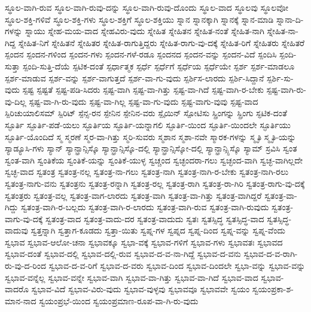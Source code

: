 {ಸ್ಥೂಲ-ವಾಗಿ-ರುವ
ಸ್ಥೂಲ-ವಾಗಿ-ರುವು-ದನ್ನು
ಸ್ಥೂಲ-ವಾಗಿ-ರುವು-ದೊಂದು
ಸ್ಥೂಲ-ವಾದ
ಸ್ಥೂಲವು
ಸ್ಥೂಲವೋ
ಸ್ಥೂಲ-ಶಕ್ತಿ-ಗಳಿವೆ
ಸ್ಥೂಲ-ಶಕ್ತಿ-ಗಳು
ಸ್ಥೂಲ-ಶಕ್ತಿಗೆ
ಸ್ಥೂಲ-ಶಕ್ತಿಯು
ಸ್ನಾನ
ಸ್ನಾನಕ್ಕಾಗಿ
ಸ್ನಾನಕ್ಕೆ
ಸ್ನಾನ-ಮಾಡಿ
ಸ್ನಾನಾ-ದಿ-ಗಳನ್ನು
ಸ್ನಾಯು
ಸ್ನೇಹ-ಮಯ-ವಾದ
ಸ್ನೇಹವಿರು-ವುದು
ಸ್ನೇಹಿತ
ಸ್ನೇಹಿತನ
ಸ್ನೇಹಿತ-ನಂತೆ
ಸ್ನೇಹಿತ-ನಾಗಿ
ಸ್ನೇಹಿತ-ನಾ-ಗಿದ್ದ
ಸ್ನೇಹಿತ-ನಿಗೆ
ಸ್ನೇಹಿತನೆ
ಸ್ನೇಹಿತರ
ಸ್ನೇಹಿತ-ರಾಗುತ್ತಿದ್ದರು
ಸ್ನೇಹಿತ-ರಾಗು-ವು-ದಕ್ಕೆ
ಸ್ನೇಹಿತ-ರಿಗೆ
ಸ್ನೇಹಿತರು
ಸ್ನೇಹಿತರೆ
ಸ್ಪಂದನ
ಸ್ಪಂದನ-ಗಳಿಂದ
ಸ್ಪಂದನ-ಗಳು
ಸ್ಪಂದನ-ಗಳೆ-ರಡೂ
ಸ್ಪಂದನದ
ಸ್ಪಂದನ-ವನ್ನು
ಸ್ಪಂದನ-ವಿದೆ
ಸ್ಪಂದಿಸಿ
ಸ್ಪಂದಿ-ಸುತ್ತಾ
ಸ್ಪಂದಿ-ಸುತ್ತಿ-ದೆಯೆ
ಸ್ಪಟಿಕ-ದಂತೆ
ಸ್ಪರ್ಧಾತ್ಮಕ
ಸ್ಪರ್ಧೆ
ಸ್ಪರ್ಧೆಗೆ
ಸ್ಪರ್ಧೆಯ
ಸ್ಪರ್ಧೆಯೇ
ಸ್ಪರ್ಶ
ಸ್ಪರ್ಶ-ಮಾಡಲೂ
ಸ್ಪರ್ಶ-ಮಾಡುವ
ಸ್ಪರ್ಶ-ವನ್ನು
ಸ್ಪರ್ಶ-ವಾಗುತ್ತದೆ
ಸ್ಪರ್ಶ-ವಾ-ಗು-ವುದು
ಸ್ಪರ್ಶಿಸ-ಲಾರದು
ಸ್ಪರ್ಶಿ-ಸಿದ್ದಾನೆ
ಸ್ಪರ್ಶಿ-ಸು-ವುದು
ಸ್ಪಷ್ಟ
ಸ್ಪಷ್ಟತೆ
ಸ್ಪಷ್ಟ-ಪಡಿ-ಸಿದರು
ಸ್ಪಷ್ಟ-ವಾಗಿ
ಸ್ಪಷ್ಟ-ವಾ-ಗಿತ್ತು
ಸ್ಪಷ್ಟ-ವಾ-ಗಿದೆ
ಸ್ಪಷ್ಟ-ವಾಗಿ-ರ-ಬೇಕು
ಸ್ಪಷ್ಟ-ವಾಗಿ-ರು-ವು-ದಿಲ್ಲ
ಸ್ಪಷ್ಟ-ವಾ-ಗಿ-ರು-ವುದು
ಸ್ಪಷ್ಟ-ವಾ-ಗಿಲ್ಲ
ಸ್ಪಷ್ಟ-ವಾ-ಗು-ವುದು
ಸ್ಪಷ್ಟ-ವಾಗು-ವುವು
ಸ್ಪಷ್ಟ-ವಾದ
ಸ್ಪಿರಿಚುಯಾಲಿಸಮ್
ಸ್ಪಿರಿಟ್
ಸ್ಪೆನ್ಸ-ರನ
ಸ್ಪೇನಿನ
ಸ್ಪೇನಿನ-ವರು
ಸ್ಪೈಯಿನ್
ಸ್ಪೋಟಿಸು
ಸ್ಪ್ರಿಂಗನ್ನು
ಸ್ಪ್ರಿಂಗು
ಸ್ಫಟಿಕ-ದಂತೆ
ಸ್ಫೂರ್ತಿ
ಸ್ಫೂರ್ತಿ-ಪಡೆ-ಯಲು
ಸ್ಫೂರ್ತಿಯ
ಸ್ಫೂರ್ತಿ-ಯನ್ನಾಗಲಿ
ಸ್ಫೂರ್ತಿ-ಯಿಂದ
ಸ್ಫೂರ್ತಿ-ಯಿಂದಲೇ
ಸ್ಫೂರ್ತಿಯು
ಸ್ಫೂರ್ತಿ-ಯೊಂದಿದೆ
ಸ್ಮ
ಸ್ಮರಣೆ
ಸ್ಮರ-ವಾ-ಗಿತ್ತು
ಸ್ಮರಿ-ಸುವರು
ಸ್ಮಶಾನ
ಸ್ಮಶಾ-ನವೇ
ಸ್ಮಾರಕ-ಗಳನ್ನು
ಸ್ಮೃತಿ
ಸ್ಮೃತಿ-ಯನ್ನು
ಸ್ಯಾಡ್ಯೂಸಿ-ಗಳು
ಸ್ಯಾನ್
ಸ್ಯಾನ್ಫ್ರಾನ್ಸಿಸ್ಕೊ
ಸ್ಯಾನ್ಫ್ರಾನ್ಸಿಸ್ಕೊ-ದಲ್ಲಿ
ಸ್ಯಾನ್ಫ್ರಾನ್ಸಿಸ್ಕೋ-ದಲ್ಲಿ
ಸ್ಯಾನ್ಫ್ರಾನ್ಸ್ಸಿಸ್ಕೊ
ಸ್ಯಾಮ್
ಸ್ರವಿಸಿ
ಸ್ವಂತ
ಸ್ವಂತ-ವಾಗಿ
ಸ್ವಂತಿಕೆಯ
ಸ್ವಂತಿಕೆ-ಯನ್ನು
ಸ್ವಂತಿಕೆ-ಯುಳ್ಳ
ಸ್ವಚ್ಚಂದ
ಸ್ವಚ್ಛಂದರಾ-ಗಲು
ಸ್ವಚ್ಛಂದ-ವಾಗಿ
ಸ್ವಚ್ಛ-ವಾಗಿಲ್ಲದೇ
ಸ್ವಚ್ಛ-ವಾದ
ಸ್ವತಂತ್ರ
ಸ್ವತಂತ್ರ-ನಲ್ಲ
ಸ್ವತಂತ್ರ-ನಾ-ಗಲು
ಸ್ವತಂತ್ರ-ನಾಗಿ
ಸ್ವತಂತ್ರ-ನಾಗಿ-ರ-ಬೇಕು
ಸ್ವತಂತ್ರ-ನಾಗಿ-ರಲು
ಸ್ವತಂತ್ರ-ನಾಗು-ವನು
ಸ್ವತಂತ್ರನು
ಸ್ವತಂತ್ರ-ರನ್ನಾಗಿ
ಸ್ವತಂತ್ರ-ರಲ್ಲ
ಸ್ವತಂತ್ರ-ರಾಗಿ
ಸ್ವತಂತ್ರ-ರಾ-ಗಿರಿ
ಸ್ವತಂತ್ರ-ರಾಗು-ವು-ದಕ್ಕೆ
ಸ್ವತಂತ್ರರು
ಸ್ವತಂತ್ರ-ವಲ್ಲ
ಸ್ವತಂತ್ರ-ವಾಗ-ಲಾರದು
ಸ್ವತಂತ್ರ-ವಾಗಿ
ಸ್ವತಂತ್ರ-ವಾ-ಗಿತ್ತು
ಸ್ವತಂತ್ರ-ವಾಗಿದ್ದರೆ
ಸ್ವತಂತ್ರ-ವಾ-ಗಿದ್ದು
ಸ್ವತಂತ್ರ-ವಾಗಿ-ರ-ಬಲ್ಲದು
ಸ್ವತಂತ್ರ-ವಾಗಿ-ರ-ಲಾರದು
ಸ್ವತಂತ್ರ-ವಾಗಿ-ರುವ
ಸ್ವತಂತ್ರ-ವಾಗಿ-ರುವುದು
ಸ್ವತಂತ್ರ-ವಾಗು-ವು-ದಕ್ಕೆ
ಸ್ವತಂತ್ರ-ವಾದ
ಸ್ವತಂತ್ರ-ವಾದು-ದರ
ಸ್ವತಂತ್ರ-ವಾದುದು
ಸ್ವತಃ
ಸ್ವತಸ್ಸಿದ್ಧ
ಸ್ವತಸ್ಸಿದ್ಧ-ವಾದ
ಸ್ವತಸ್ಸಿದ್ಧ-ವಾದುವು
ಸ್ವತ್ತನ್ನಾಗಿ
ಸ್ವತ್ತಾಗ-ಕೂಡದು
ಸ್ವತ್ತಾ-ಯಿತು
ಸ್ವಪ್ನ-ಗಳ
ಸ್ವಪ್ನದ
ಸ್ವಪ್ನ-ದಿಂದ
ಸ್ವಪ್ನ-ವನ್ನು
ಸ್ವಪ್ನ-ವೆಂದು
ಸ್ವಭಾವ
ಸ್ವಭಾವ-ಆಲೋ-ಚನಾ
ಸ್ವಭಾವಕ್ಕೂ
ಸ್ವಭಾ-ವಕ್ಕೆ
ಸ್ವಭಾವ-ಗಳಿಗೆ
ಸ್ವಭಾವ-ಗಳು
ಸ್ವಭಾವತಃ
ಸ್ವಭಾವದ
ಸ್ವಭಾವ-ದಂತೆ
ಸ್ವಭಾವ-ದಲ್ಲಿ
ಸ್ವಭಾವ-ದಲ್ಲಿ-ರುವ
ಸ್ವಭಾವ-ದ-ವ-ನಾ-ಗಿದ್ದೆ
ಸ್ವಭಾವ-ದ-ವನು
ಸ್ವಭಾವ-ದ-ವ-ರಾಗಿ-ರು-ವು-ದ-ರಿಂದ
ಸ್ವಭಾವ-ದ-ವ-ರಿಗೆ
ಸ್ವಭಾವ-ದ-ವರು
ಸ್ವಭಾವ-ದಿಂದ
ಸ್ವಭಾವ-ದಿಂದಲೇ
ಸ್ವಭಾ-ವನ್ನು
ಸ್ವಭಾವ-ವನ್ನು
ಸ್ವಭಾವ-ವನ್ನೆಲ್ಲ
ಸ್ವಭಾವ-ವನ್ನೇ
ಸ್ವಭಾವ-ವಾಗಿ
ಸ್ವಭಾವ-ವಾ-ಗಿತ್ತು
ಸ್ವಭಾವ-ವಾ-ಗಿದೆ
ಸ್ವಭಾವ-ವಾದ
ಸ್ವಭಾವ-ವಾದರೊ
ಸ್ವಭಾವ-ವಿದೆ
ಸ್ವಭಾವ-ವಿರು-ವುದು
ಸ್ವಭಾವ-ವುಳ್ಳವು
ಸ್ವಭಾವವೂ
ಸ್ವಭಾವವೇ
ಸ್ವಯಂ
ಸ್ವಯಂಪ್ರಕಾ-ಶ-ಮಾನ-ನಾದ
ಸ್ವಯಂಪ್ರಭೆ-ಯಿಂದ
ಸ್ವಯಂಪ್ರಮಾಣ-ರೂಪ-ವಾ-ಗಿ-ರು-ವುದು
}
